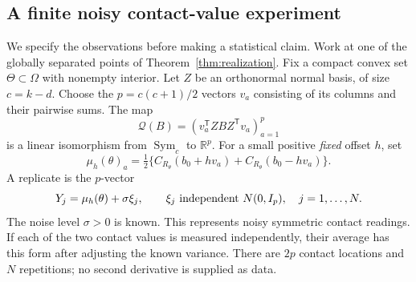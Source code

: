\documentclass[11pt,reqno]{amsart}
\numberwithin{equation}{section}
\theoremstyle{definition}\newtheorem{definition}[theorem]{Definition}
\theoremstyle{remark}\newtheorem{remark}[theorem]{Remark}
\newcommand{\R}{\mathbb R}
\newcommand{\Sym}{\operatorname{Sym}}
\begin{document}
\subsection{A finite noisy contact-value experiment}
We specify the observations before making a statistical claim. Work at one of the globally separated points of Theorem~\ref{thm:realization}. Fix a compact convex set $\Theta\subset\Omega$ with nonempty interior. Let $Z$ be an orthonormal normal basis, of size $c=k-d$. Choose the $p=c(c+1)/2$ vectors $v_a$ consisting of its columns and their pairwise sums. The map
\[
 \mathcal Q(B)=(v_a^{\mathsf T}ZBZ^{\mathsf T}v_a)_{a=1}^p
\]
is a linear isomorphism from $\Sym_c$ to $\R^p$. For a small positive \emph{fixed} offset $h$, set
\begin{equation}\label{eq:mean}
 \mu_h(\theta)_a=\tfrac12\{C_{R_\theta}(b_0+hv_a)+C_{R_\theta}(b_0-hv_a)\}.
\end{equation}
A replicate is the $p$-vector
\begin{equation}\label{eq:noise}
 Y_j=\mu_h(\theta)+\sigma\xi_j,\qquad
 \xi_j\ \hbox{independent }N(0,I_p),\quad j=1,\ldots,N.
\end{equation}
The noise level $\sigma>0$ is known. This represents noisy symmetric contact readings. If each of the two contact values is measured independently, their average has this form after adjusting the known variance. There are $2p$ contact locations and $N$ repetitions; no second derivative is supplied as data.
\end{document}
